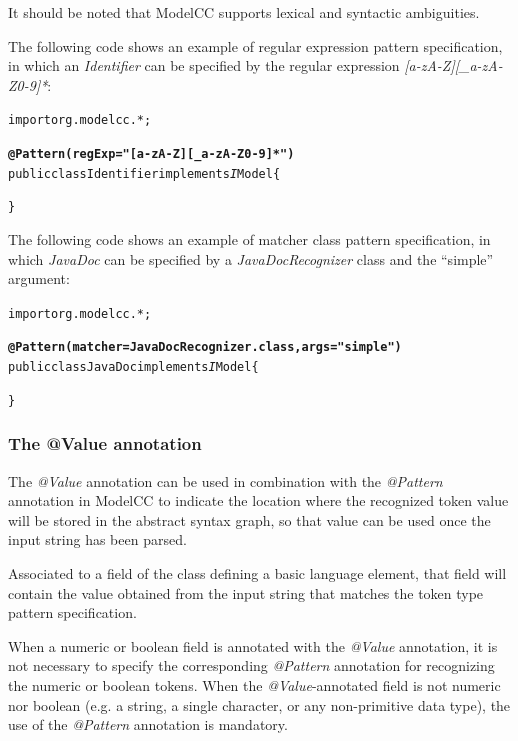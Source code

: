 \documentclass[a4paper,twoside,onecolumn]{article}
\newenvironment{colframe}{%
  \begin{Sbox} 
    \begin{minipage}{.8\columnwidth} 
}{%

  \end{minipage} 
  \end{Sbox} 
  \begin{center} 
    \fcolorbox{black}{MyGray}{\TheSbox} 
  \end{center} 
}
\newcommand{\an}[1]{\emph{#1}} %
\begin{document}
It should be noted that ModelCC supports lexical and syntactic ambiguities.

The following code shows an example of regular expression pattern specification, in which an \emph{Identifier} can be specified by the regular expression \emph{[a-zA-Z][\_a-zA-Z0-9]*}:

\begin{colframe}
\begin{alltt}
import org.modelcc.*;

{\bf\unskip @Pattern(regExp="[a-zA-Z][_a-zA-Z0-9]*")}
public class Identifier implements{\emph IModel} \{

\}
\end{alltt}
\end{colframe}

The following code shows an example of matcher class pattern specification, in which \emph{JavaDoc} can be specified by a \emph{JavaDocRecognizer} class and the ``simple'' argument:

\begin{colframe}
\begin{alltt}
import org.modelcc.*;

{\bf\unskip @Pattern(matcher=JavaDocRecognizer.class,args="simple")}
public class JavaDoc implements{\emph IModel} \{

\}
\end{alltt}
\end{colframe}

\subsubsection{The @Value annotation}

The \an{@Value} annotation can be used in combination with the \an{@Pattern} annotation in ModelCC to indicate the location where the recognized
token value will be stored in the abstract syntax graph, so that value can be used once the input string has been parsed.

Associated to a field of the class defining a basic language element, that field will contain the value obtained from the input string that
matches the token type pattern specification.

When a numeric or boolean field is annotated with the \an{@Value} annotation, it is not necessary to specify the corresponding \an{@Pattern}
annotation for recognizing the numeric or boolean tokens. When the \an{@Value}-annotated field is not numeric nor boolean (e.g. a string, a
single character, or any non-primitive data type), the use of the \an{@Pattern} annotation is mandatory.
\end{document}
